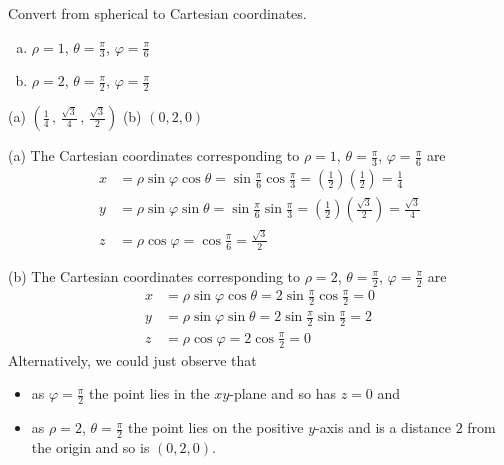 \begin{question}
Convert from spherical to Cartesian coordinates.
\begin{enumerate}[(a)]
\item $\rho=1$, $\theta=\frac{\pi}{3}$, $\varphi=\frac{\pi}{6}$
\item $\rho=2$, $\theta=\frac{\pi}{2}$, $\varphi=\frac{\pi}{2}$
\end{enumerate}

\end{question}

%

\begin{answer}
(a) $\left(\frac{1}{4}\,,\,\frac{\sqrt{3}}{4}\,,\,\frac{\sqrt{3}}{2}\right)$
\qquad
(b) $(0,2,0)$

\end{answer}

\begin{solution}
(a) The Cartesian coordinates corresponding to 
$\rho=1$, $\theta=\frac{\pi}{3}$, $\varphi=\frac{\pi}{6}$ are
\begin{align*}
x&=\rho\sin\varphi\cos\theta
  =\sin\frac{\pi}{6}\cos\frac{\pi}{3}
  =\left(\frac{1}{2}\right)\left(\frac{1}{2}\right)
  =\frac{1}{4}
\\
y&=\rho\sin\varphi\sin\theta
  =\sin\frac{\pi}{6}\sin\frac{\pi}{3}
  =\left(\frac{1}{2}\right)\left(\frac{\sqrt{3}}{2}\right)
  =\frac{\sqrt{3}}{4}
\\
z&=\rho\cos\varphi
  =\cos\frac{\pi}{6}
  =\frac{\sqrt{3}}{2}
\end{align*}

(b) The Cartesian coordinates corresponding to 
$\rho=2$, $\theta=\frac{\pi}{2}$, $\varphi=\frac{\pi}{2}$ are
\begin{align*}
x&=\rho\sin\varphi\cos\theta
  =2\sin\frac{\pi}{2}\cos\frac{\pi}{2}
  =0
\\
y&=\rho\sin\varphi\sin\theta
  =2\sin\frac{\pi}{2}\sin\frac{\pi}{2}
  =2
\\
z&=\rho\cos\varphi
  =2\cos\frac{\pi}{2}
  =0
\end{align*}
Alternatively, we could just observe that
\begin{itemize}
\item
as $\varphi=\frac{\pi}{2}$ the point lies in the $xy$-plane
and so has $z=0$ and
\item
as $\rho=2$, $\theta=\frac{\pi}{2}$ the point lies on the positive $y$-axis
and is a distance $2$ from the origin and so is $(0,2,0)$. 
\end{itemize}

\end{solution}

